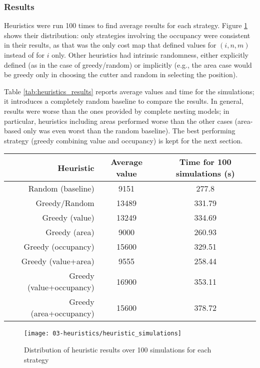 \subsubsection{Results}
Heuristics were run 100 times to find average results for each strategy. Figure \ref{fig:heuristics_results} shows their distribution: only strategies involving the occupancy were consistent in their results, as that was the only cost map that defined values for $(i, n, m)$ instead of for $i$ only. Other heuristics had intrinsic randomness, either explicitly defined (as in the case of greedy/random) or implicitly (e.g., the area case would be greedy only in choosing the cutter and random in selecting the position).

Table \ref{tab:heuristics_results} reports average values and time for the simulations; it introduces a completely random baseline to compare the results. In general, results were worse than the ones provided by complete nesting models; in particular, heuristics including areas performed worse than the other cases (area-based only was even worst than the random baseline). The best performing strategy (greedy combining value and occupancy) is kept for the next section.

\begin{center}
	\begin{tabular}{r|c|c}
		Heuristic					& Average value	& Time for 100 simulations (s) 	\\
		\hline
		Random (baseline) 			& 9151 			& 277.8 						\\
		Greedy/Random 				& 13489 		& 331.79 						\\
		Greedy (value) 				& 13249			& 334.69 						\\
		Greedy (area) 				& 9000 			& 260.93						\\
		Greedy (occupancy) 			& 15600			& 329.51						\\
		Greedy (value+area) 		& 9555			& 258.44						\\
		Greedy (value+occupancy)	& 16900			& 353.11						\\
		Greedy (area+occupancy)		& 15600			& 378.72						\\
	\end{tabular}
\end{center}

\begin{figure}[H]
	\centering	
	\texttt{[image: 03-heuristics/heuristic\_simulations]}
	\caption{Distribution of heuristic results over 100 simulations for each strategy}
	\label{fig:heuristics_results}
\end{figure}

